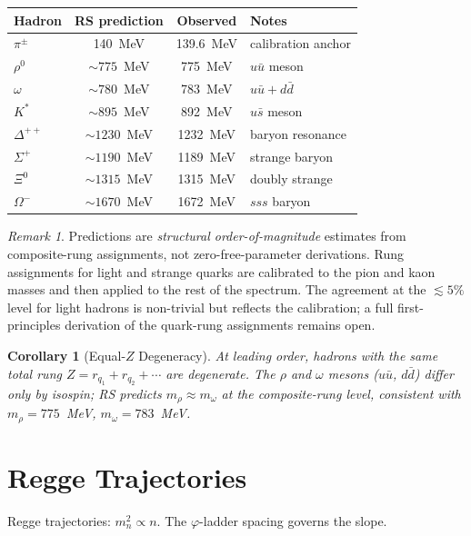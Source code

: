 \documentclass[12pt,a4paper]{article}
\newtheorem{corollary}[theorem]{Corollary}
\theoremstyle{definition}
\theoremstyle{remark}
\newtheorem{remark}[theorem]{Remark}
\begin{document}
\begin{center}
\renewcommand{\arraystretch}{1.15}
\begin{tabular}{@{}lccl@{}}
\toprule
\textbf{Hadron} & \textbf{RS prediction} & \textbf{Observed} &
\textbf{Notes} \\
\midrule
$\pi^\pm$ & 140~MeV & 139.6~MeV & calibration anchor \\
$\rho^0$ & $\sim 775$~MeV & 775~MeV & $u\bar{u}$ meson \\
$\omega$ & $\sim 780$~MeV & 783~MeV & $u\bar{u}+d\bar{d}$ \\
$K^*$ & $\sim 895$~MeV & 892~MeV & $u\bar{s}$ meson \\
$\Delta^{++}$ & $\sim 1230$~MeV & 1232~MeV & baryon resonance \\
$\Sigma^+$ & $\sim 1190$~MeV & 1189~MeV & strange baryon \\
$\Xi^0$ & $\sim 1315$~MeV & 1315~MeV & doubly strange \\
$\Omega^-$ & $\sim 1670$~MeV & 1672~MeV & $sss$ baryon \\
\bottomrule
\end{tabular}
\end{center}

\begin{remark}
Predictions are \emph{structural order-of-magnitude} estimates from
composite-rung assignments, not zero-free-parameter derivations.
Rung assignments for light and strange quarks are calibrated to the
pion and kaon masses and then applied to the rest of the spectrum.
The agreement at the $\lesssim 5\%$ level for light hadrons is
non-trivial but reflects the calibration; a full first-principles
derivation of the quark-rung assignments remains open.
\end{remark}

\begin{corollary}[Equal-$Z$ Degeneracy]
\label{cor:degeneracy}
At leading order, hadrons with the same total rung $Z =
r_{q_1}+r_{q_2}+\cdots$ are degenerate.  The $\rho$ and $\omega$ mesons
($u\bar{u}$, $d\bar{d}$) differ only by isospin; RS predicts
$m_\rho \approx m_\omega$ at the composite-rung level, consistent with
$m_\rho = 775$~MeV, $m_\omega = 783$~MeV.
\end{corollary}

\section{Regge Trajectories}\label{sec:regge}

Regge trajectories: $m_n^2 \propto n$.  The $\varphi$-ladder spacing governs the slope.
\end{document}
